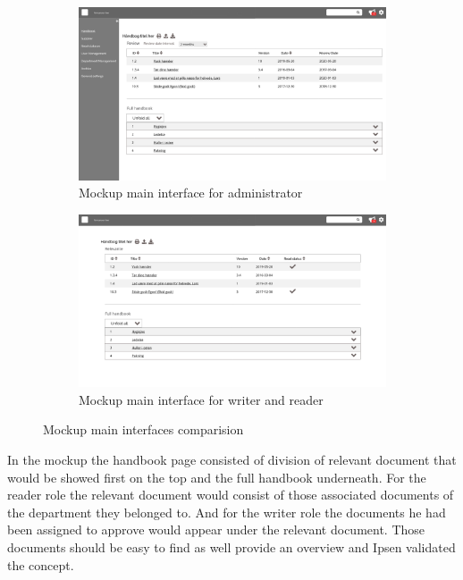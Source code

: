 \begin{figure}[H]
	\centering
	\begin{subfigure}[b]{0.48\textwidth}
		\includegraphics[width=\textwidth]{billeder/ForsideAdmin.jpg}
		\caption{Mockup main interface for administrator}
	\end{subfigure}
	\quad
	\begin{subfigure}[b]{0.48\textwidth}
		\includegraphics[width=\textwidth]{billeder/ForsideWriterReader.jpg}
		\caption{Mockup main interface for writer and reader}
	\end{subfigure}
	\caption{Mockup main interfaces comparision}\label{fig:mockupSidebar}
\end{figure}

In the mockup the handbook page consisted of division of relevant document that would be showed first on the top and the full handbook underneath.
For the reader role the relevant document would consist of those associated documents of the department they belonged to.
And for the writer role the documents he had been assigned to approve would appear under the relevant document.
Those documents should be easy to find as well provide an overview and Ipsen validated the concept.

